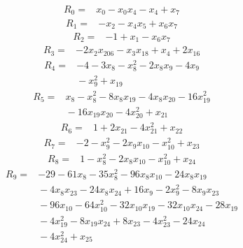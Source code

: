 {\small
\setlength{\jot}{2pt}
\allowdisplaybreaks[2]
\begin{align*}
R_{0} ={}& x_{0} - x_{0} x_{4} - x_{4} + x_{7}
\end{align*}
\begin{align*}
R_{1} ={}& -x_{2} - x_{4} x_{5} + x_{6} x_{7}
\end{align*}
\begin{align*}
R_{2} ={}& -1 + x_{1} - x_{6} x_{7}
\end{align*}
\begin{align*}
R_{3} ={}& -2x_{2} x_{206} - x_{3} x_{18} + x_{4} + 2x_{16}
\end{align*}
\begin{align*}
R_{4} ={}& -4 - 3x_{8} - x_{8}^{2} - 2x_{8} x_{9} - 4x_{9} \\
&{}  - x_{9}^{2} + x_{19}
\end{align*}
\begin{align*}
R_{5} ={}& x_{8} - x_{8}^{2} - 8x_{8} x_{19} - 4x_{8} x_{20} - 16x_{19}^{2} \\
&{}  - 16x_{19} x_{20} - 4x_{20}^{2} + x_{21}
\end{align*}
\begin{align*}
R_{6} ={}& 1 + 2x_{21} - 4x_{21}^{2} + x_{22}
\end{align*}
\begin{align*}
R_{7} ={}& -2 - x_{9}^{2} - 2x_{9} x_{10} - x_{10}^{2} + x_{23}
\end{align*}
\begin{align*}
R_{8} ={}& 1 - x_{8}^{2} - 2x_{8} x_{10} - x_{10}^{2} + x_{24}
\end{align*}
\begin{align*}
R_{9} ={}& -29 - 61x_{8} - 35x_{8}^{2} - 96x_{8} x_{10} - 24x_{8} x_{19} \\
&{}  - 4x_{8} x_{23} - 24x_{8} x_{24} + 16x_{9} - 2x_{9}^{2} - 8x_{9} x_{23} \\
&{}  - 96x_{10} - 64x_{10}^{2} - 32x_{10} x_{19} - 32x_{10} x_{24} - 28x_{19} \\
&{}  - 4x_{19}^{2} - 8x_{19} x_{24} + 8x_{23} - 4x_{23}^{2} - 24x_{24} \\
&{}  - 4x_{24}^{2} + x_{25}
\end{align*}
}
